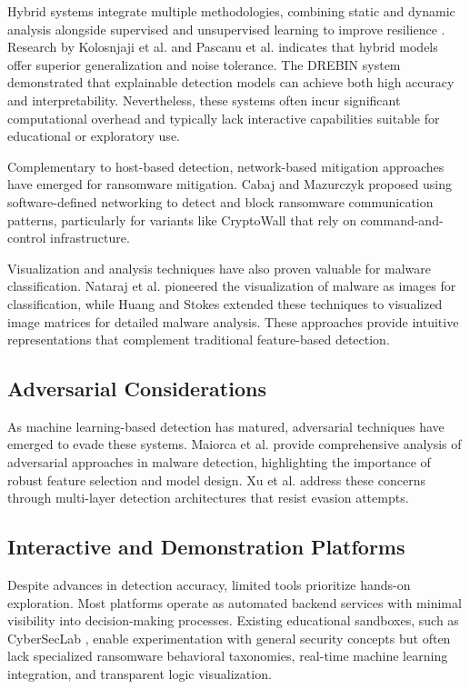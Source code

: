 Hybrid systems integrate multiple methodologies, combining static and dynamic analysis alongside supervised and unsupervised learning to improve resilience \cite{damodaran2017comparison}. Research by Kolosnjaji et al. \cite{kolosnjaji2018deep} and Pascanu et al. \cite{pascanu2013malware} indicates that hybrid models offer superior generalization and noise tolerance. The DREBIN system \cite{arp2014drebin} demonstrated that explainable detection models can achieve both high accuracy and interpretability. Nevertheless, these systems often incur significant computational overhead and typically lack interactive capabilities suitable for educational or exploratory use.

Complementary to host-based detection, network-based mitigation approaches have emerged for ransomware mitigation. Cabaj and Mazurczyk \cite{cabaj2016using} proposed using software-defined networking to detect and block ransomware communication patterns, particularly for variants like CryptoWall that rely on command-and-control infrastructure.

Visualization and analysis techniques have also proven valuable for malware classification. Nataraj et al. \cite{nataraj2011malware} pioneered the visualization of malware as images for classification, while Huang and Stokes \cite{huang2017malware} extended these techniques to visualized image matrices for detailed malware analysis. These approaches provide intuitive representations that complement traditional feature-based detection.

\subsection{Adversarial Considerations}

As machine learning-based detection has matured, adversarial techniques have emerged to evade these systems. Maiorca et al. \cite{maiorca2017towards} provide comprehensive analysis of adversarial approaches in malware detection, highlighting the importance of robust feature selection and model design. Xu et al. \cite{xu2016deeprefiner} address these concerns through multi-layer detection architectures that resist evasion attempts.

\subsection{Interactive and Demonstration Platforms}

Despite advances in detection accuracy, limited tools prioritize hands-on exploration. Most platforms operate as automated backend services with minimal visibility into decision-making processes. Existing educational sandboxes, such as CyberSecLab \cite{lee2022cyberseclab}, enable experimentation with general security concepts but often lack specialized ransomware behavioral taxonomies, real-time machine learning integration, and transparent logic visualization.


